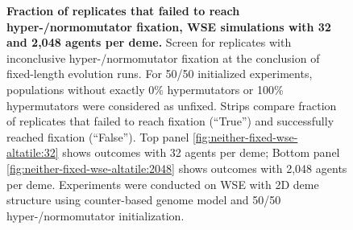 \begin{figure}[h]
  \begin{minipage}{\textwidth}
    \caption{%
\textbf{Fraction of replicates that failed to reach hyper-/normomutator fixation, WSE simulations with 32 and 2,048 agents per deme.}
\footnotesize
Screen for replicates with inconclusive hyper-/normomutator fixation at the conclusion of fixed-length evolution runs.
For 50/50 initialized experiments, populations without exactly 0\% hypermutators or 100\% hypermutators were considered as unfixed.
Strips compare fraction of replicates that failed to reach fixation (``True'') and successfully reached fixation (``False'').
Top panel \ref{fig:neither-fixed-wse-altatile:32} shows outcomes with 32 agents per deme;
Bottom panel \ref{fig:neither-fixed-wse-altatile:2048} shows outcomes with 2,048 agents per deme.
Experiments were conducted on WSE with 2D deme structure using counter-based genome model and 50/50 hyper-/normomutator initialization.
    }
    \label{fig:neither-fixed-wse-altatile}
  \end{minipage}
\end{figure}
